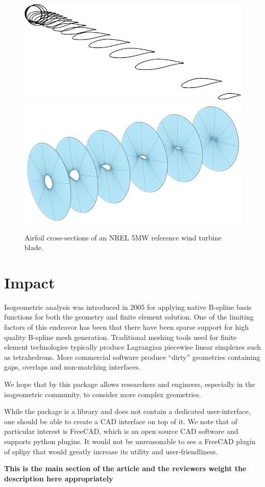 \documentclass[preprint,12pt, a4paper]{elsarticle}
\begin{document}
\begin{figure}
  \begin{center}
    \includegraphics[width=.4\textwidth]{figs/airfoils}
    \includegraphics[width=.5\textwidth]{figs/crossecs2}
  \end{center}
  \caption{Airfoil cross-sections of an NREL 5MW reference wind turbine blade.}
  \label{fig:airfoils}
\end{figure}

\section{Impact}
\label{}

Isogeometric analysis was introduced in 2005 \cite{hughes2005iac} for applying native B-spline basis functions for both the geometry and finite element solution.
One of the limiting factors of this endeavor has been that there have been sparse support for high quality B-spline mesh generation.
Traditional meshing tools used for finite element technologies typically produce Lagrangian piecewise linear simplexes such as tetrahedrons.
More commercial software produce ``dirty'' geometries containing gaps, overlaps and non-matching interfaces.

We hope that by this package allows researchers and engineers, especially in the isogeometric community, to consider more complex geometries.

While the package is a library and does not contain a dedicated user-interface, one should be able to create a CAD interface on top of it.
We note that of particular interest is FreeCAD, which is an open source CAD software and supports python plugins.
It would not be unreasonable to see a FreeCAD plugin of splipy that would greatly increase its utility and user-friendliness.

\textbf{This is the main section of the article and the reviewers weight the description here appropriately}
\end{document}
